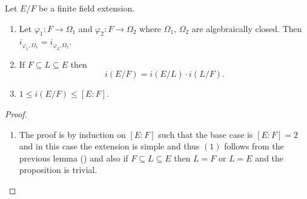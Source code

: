 \documentclass[11pt,a4paper]{article}
\begin{document}
\begin{proposition}
  Let $E/F$ be a finite field extension.
  \begin{enumerate}
    \item[(1)] Let $\varphi_1 \colon F \to \Omega_1$ and
                $\varphi_2 \colon F \to \Omega_2$
                where $\Omega_1$, $\Omega_2$ are algebraically closed.
                Then
                $i_{\varphi_1,\Omega_1} = i_{\varphi_2,\Omega_2}$.
    \item[(2)] If $F \subseteq L \subseteq E$ then
      \[
        i(E/F) = i(E/L) \cdot i(L/F).
      \]
    \item[(3)] $1 \le i(E/F) \le [E : F]$.
  \end{enumerate}
\end{proposition}
\begin{proof} \phantom{}
\begin{enumerate}
  \item[(1) + (2)] The proof is by induction on $[E : F]$
    such that the base case is $[E : F] = 2$ and in this
    case the extension is simple and thus $(1)$ follows from
    the previous lemma () and also if
    $F \subseteq L \subseteq E$ then $L = F$ or $L = E$
    and the proposition is trivial.


\end{enumerate}
\end{proof}
\end{document}
